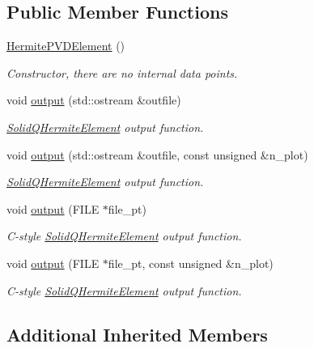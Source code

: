 \subsection*{Public Member Functions}
\begin{DoxyCompactItemize}
\item 
\hyperlink{classoomph_1_1HermitePVDElement_abfa0fec4ed71f1599c9d5e925ad5ce2d}{Hermite\+P\+V\+D\+Element} ()
\begin{DoxyCompactList}\small\item\em Constructor, there are no internal data points. \end{DoxyCompactList}\item 
void \hyperlink{classoomph_1_1HermitePVDElement_aa0e10a14a3b005e07d74c9fa99e47d48}{output} (std\+::ostream \&outfile)
\begin{DoxyCompactList}\small\item\em \hyperlink{classoomph_1_1SolidQHermiteElement}{Solid\+Q\+Hermite\+Element} output function. \end{DoxyCompactList}\item 
void \hyperlink{classoomph_1_1HermitePVDElement_a9de8d6a3b4e844189a97eb19e7b034c1}{output} (std\+::ostream \&outfile, const unsigned \&n\+\_\+plot)
\begin{DoxyCompactList}\small\item\em \hyperlink{classoomph_1_1SolidQHermiteElement}{Solid\+Q\+Hermite\+Element} output function. \end{DoxyCompactList}\item 
void \hyperlink{classoomph_1_1HermitePVDElement_a5567656681b134890e6940972a2461d5}{output} (F\+I\+LE $\ast$file\+\_\+pt)
\begin{DoxyCompactList}\small\item\em C-\/style \hyperlink{classoomph_1_1SolidQHermiteElement}{Solid\+Q\+Hermite\+Element} output function. \end{DoxyCompactList}\item 
void \hyperlink{classoomph_1_1HermitePVDElement_a4a8edf00d8c8b4fe61676fead8413ab9}{output} (F\+I\+LE $\ast$file\+\_\+pt, const unsigned \&n\+\_\+plot)
\begin{DoxyCompactList}\small\item\em C-\/style \hyperlink{classoomph_1_1SolidQHermiteElement}{Solid\+Q\+Hermite\+Element} output function. \end{DoxyCompactList}\end{DoxyCompactItemize}
\subsection*{Additional Inherited Members}


